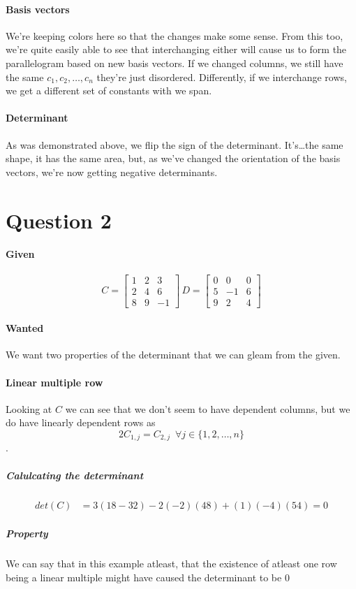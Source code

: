 \documentclass{article}
\begin{document}
\begin{enumerate}[label=(\alph*)]
                      \paragraph{Basis vectors}
                        We're keeping colors here so that the changes make some sense.
                        From this too, we're quite easily able to see that interchanging either
                        will cause us to form the parallelogram based on new basis vectors.
                        If we changed columns, we still have the same ${c_1,c_2,\dots,c_n}$
                        they're just disordered. Differently, if we interchange rows,
                        we get a different set of constants with we span.
                      \paragraph{Determinant}
                        As was demonstrated above, we flip the sign of the determinant.
                        It's\dots the same shape, it has the same area, but, as we've changed
                        the orientation of the basis vectors, we're now getting negative determinants.
            \end{enumerate}
    \section{Question 2}
      \paragraph{Given}
        \[
        C=\begin{bmatrix}1&2&3\\2&4&6\\8&9&-1\end{bmatrix}
        \,
        D=\begin{bmatrix}0&0&0\\5&-1&6\\9&2&4\end{bmatrix}
        \]
      \paragraph{Wanted}
        We want two properties of the determinant that we can gleam from the given.
      \paragraph{Linear multiple row}
          Looking at $C$ we can see that we don't seem to have dependent columns,
          but we do have linearly dependent rows as
          $$2C_{1,j}=C_{2,j}\enspace\forall{j} \in \{1,2,\dots,n\}$$
.       \subparagraph{Calulcating the determinant}
          \begin{align*}
            det(C)&=3(18-32)-2(-2)(48)+(1)(-4)(54)=0
          \end{align*}
        \subparagraph{Property}
          We can say that in this example atleast, that the existence of
          atleast one row being a linear multiple might have caused the determinant to be $0$
\end{document}
